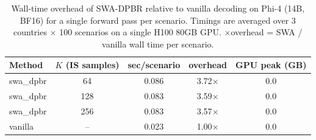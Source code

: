 \begin{table}[h]\centering\scriptsize
\caption{Wall-time overhead of SWA-DPBR relative to vanilla decoding on Phi-4 (14B, BF16) for a single forward pass per scenario. Timings are averaged over 3 countries $\times$ 100 scenarios on a single H100 80GB GPU. $\times$overhead = SWA / vanilla wall time per scenario.}
\label{tab:latency_overhead}
\begin{tabular}{lcccc}\toprule
Method & $K$ (IS samples) & sec/scenario & overhead & GPU peak (GB) \\\midrule
swa_dpbr & 64 & 0.086 & 3.72$\times$ & 0.0 \\
swa_dpbr & 128 & 0.083 & 3.59$\times$ & 0.0 \\
swa_dpbr & 256 & 0.083 & 3.57$\times$ & 0.0 \\
vanilla & -- & 0.023 & 1.00$\times$ & 0.0 \\
\bottomrule
\end{tabular}
\end{table}